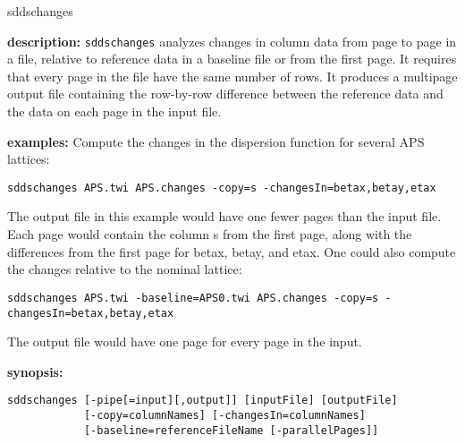 \begin{sddsprog}{sddschanges}
  \item \textbf{description:}
    \verb|sddschanges| analyzes changes in column data from page to page in a file, relative to reference data in a baseline file or from the first page. It requires that every page in the file have the same number of rows. It produces a multipage output file containing the row-by-row difference between the reference data and the data on each page in the input file.

  \item \textbf{examples:}
  Compute the changes in the dispersion function for several APS lattices:
  \begin{verbatim}
sddschanges APS.twi APS.changes -copy=s -changesIn=betax,betay,etax
  \end{verbatim}
  The output file in this example would have one fewer pages than the input file. Each page would contain the column s from the first page, along with the differences from the first page for betax, betay, and etax. One could also compute the changes relative to the nominal lattice:
  \begin{verbatim}
sddschanges APS.twi -baseline=APS0.twi APS.changes -copy=s -changesIn=betax,betay,etax
  \end{verbatim}
  The output file would have one page for every page in the input.

  \item \textbf{synopsis:}
  \begin{verbatim}
sddschanges [-pipe[=input][,output]] [inputFile] [outputFile]
            [-copy=columnNames] [-changesIn=columnNames]
            [-baseline=referenceFileName [-parallelPages]]
  \end{verbatim}


\end{sddsprog}

